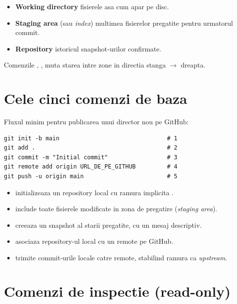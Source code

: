 \begin{itemize}
  \item \textbf{Working directory} \textendash{} fisierele asa cum apar pe disc.
  \item \textbf{Staging area} (sau \emph{index}) \textendash{} multimea fisierelor pregatite pentru urmatorul commit.
  \item \textbf{Repository} \textendash{} istoricul snapshot-urilor confirmate.
\end{itemize}

Comenzile , ,  muta starea intre zone in directia stanga $\to$ dreapta.

\section{Cele cinci comenzi de baza}

Fluxul minim pentru publicarea unui director nou pe GitHub:

\begin{lstlisting}[style=bash]
git init -b main                               # 1
git add .                                      # 2
git commit -m "Initial commit"                 # 3
git remote add origin URL_DE_PE_GITHUB         # 4
git push -u origin main                        # 5
\end{lstlisting}

\begin{itemize}
  \item {} \textendash{} initializeaza un repository local cu ramura implicita .
  \item {} \textendash{} include toate fisierele modificate in zona de pregatire (\emph{staging area}).
  \item {} \textendash{} creeaza un snapshot al starii pregatite, cu un mesaj descriptiv.
  \item {} \textendash{} asociaza repository-ul local cu un remote pe GitHub.
  \item {} \textendash{} trimite commit-urile locale catre remote, stabilind ramura  ca \emph{upstream}.
\end{itemize}

\section{Comenzi de inspectie (read-only)}

